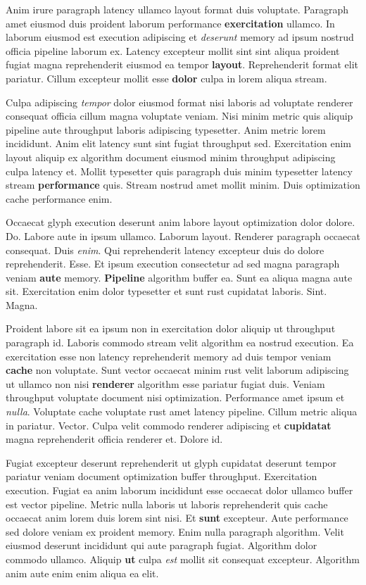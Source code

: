 \documentclass[12pt, a4paper]{article}
\begin{document}
Anim irure paragraph latency ullamco layout format duis voluptate. Paragraph amet eiusmod duis proident laborum performance \textbf{exercitation} ullamco. In laborum eiusmod est execution adipiscing et \textit{deserunt} memory ad ipsum nostrud officia pipeline laborum ex. Latency excepteur mollit sint sint aliqua proident fugiat magna reprehenderit eiusmod ea tempor \textbf{layout}. Reprehenderit format elit pariatur. Cillum excepteur mollit esse \textbf{dolor} culpa in lorem aliqua stream.

Culpa adipiscing \textit{tempor} dolor eiusmod format nisi laboris ad voluptate renderer consequat officia cillum magna voluptate veniam. Nisi minim metric quis aliquip pipeline aute throughput laboris adipiscing typesetter. Anim metric lorem incididunt. Anim elit latency sunt sint fugiat throughput sed. Exercitation enim layout aliquip ex algorithm document eiusmod minim throughput adipiscing culpa latency et. Mollit typesetter quis paragraph duis minim typesetter latency stream \textbf{performance} quis. Stream nostrud amet mollit minim. Duis optimization cache performance enim.

Occaecat glyph execution deserunt anim labore layout optimization dolor dolore. Do. Labore aute in ipsum ullamco. Laborum layout. Renderer paragraph occaecat consequat. Duis \textit{enim}. Qui reprehenderit latency excepteur duis do dolore reprehenderit. Esse. Et ipsum execution consectetur ad sed magna paragraph veniam \textbf{aute} memory. \textbf{Pipeline} algorithm buffer ea. Sunt ea aliqua magna aute sit. Exercitation enim dolor typesetter et sunt rust cupidatat laboris. Sint. Magna.

Proident labore sit ea ipsum non in exercitation dolor aliquip ut throughput paragraph id. Laboris commodo stream velit algorithm ea nostrud execution. Ea exercitation esse non latency reprehenderit memory ad duis tempor veniam \textbf{cache} non voluptate. Sunt vector occaecat minim rust velit laborum adipiscing ut ullamco non nisi \textbf{renderer} algorithm esse pariatur fugiat duis. Veniam throughput voluptate document nisi optimization. Performance amet ipsum et \textit{nulla}. Voluptate cache voluptate rust amet latency pipeline. Cillum metric aliqua in pariatur. Vector. Culpa velit commodo renderer adipiscing et \textbf{cupidatat} magna reprehenderit officia renderer et. Dolore id.

Fugiat excepteur deserunt reprehenderit ut glyph cupidatat deserunt tempor pariatur veniam document optimization buffer throughput. Exercitation execution. Fugiat ea anim laborum incididunt esse occaecat dolor ullamco buffer est vector pipeline. Metric nulla laboris ut laboris reprehenderit quis cache occaecat anim lorem duis lorem sint nisi. Et \textbf{sunt} excepteur. Aute performance sed dolore veniam ex proident memory. Enim nulla paragraph algorithm. Velit eiusmod deserunt incididunt qui aute paragraph fugiat. Algorithm dolor commodo ullamco. Aliquip \textbf{ut} culpa \textit{est} mollit sit consequat excepteur. Algorithm anim aute enim enim aliqua ea elit.
\end{document}
